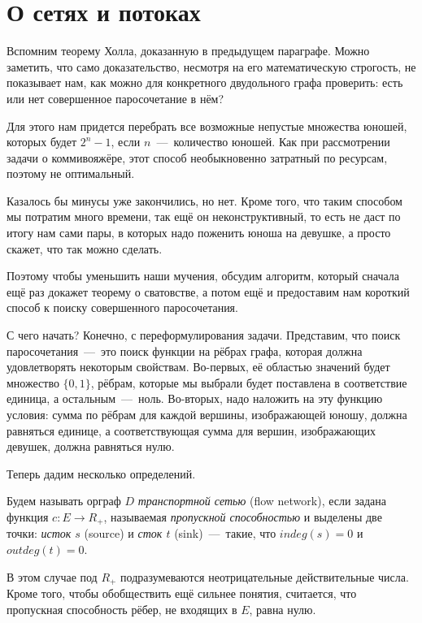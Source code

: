 \newpage
\section{О сетях и потоках}

	Вспомним теорему Холла, доказанную в предыдущем параграфе. Можно заметить, что само доказательство, несмотря на его математическую строгость, не показывает нам, как можно для конкретного двудольного графа проверить: есть или нет совершенное паросочетание в нём? 
	
	Для этого нам придется перебрать все возможные непустые множества юношей, которых будет $2^n - 1$, если $n$~---~количество юношей. Как при рассмотрении задачи о коммивояжёре, этот способ необыкновенно затратный по ресурсам, поэтому не оптимальный. 
	
	Казалось бы минусы уже закончились, но нет. Кроме того, что таким способом мы потратим много времени, так ещё он неконструктивный, то есть не даст по итогу нам сами пары, в которых надо поженить юноша на девушке, а просто скажет, что так можно сделать.
	
	Поэтому чтобы уменьшить наши мучения, обсудим алгоритм, который сначала ещё раз докажет теорему о сватовстве, а потом ещё и предоставим нам короткий способ к поиску совершенного паросочетания.

	С чего начать? Конечно, с переформулирования задачи. Представим, что поиск паросочетания~---~это поиск функции на рёбрах графа, которая должна удовлетворять некоторым свойствам. Во-первых, её областью значений будет множество $\lbrace 0, 1\rbrace$, рёбрам, которые мы выбрали будет поставлена в соответствие единица, а остальным~---~ноль. Во-вторых, надо наложить на эту функцию условия: сумма по рёбрам для каждой вершины, изображающей юношу, должна равняться единице, а соответствующая сумма для вершин, изображающих девушек, должна равняться нулю. 
	
	Теперь дадим несколько определений.
	
	
\begin{definition}
	Будем называть орграф $D$ \emph{транспортной сетью} (flow network), если задана функция $c\colon E \to R_{+}$, называемая \emph{пропускной способностью} и выделены две точки: \emph{исток $s$} (source) и \emph{сток $t$} (sink)~---~такие, что $indeg(s) = 0$ и $outdeg(t) = 0$.
\end{definition}

	В этом случае под $R_{+}$ подразумеваются неотрицательные действительные числа. Кроме того, чтобы обобществить ещё сильнее понятия, считается, что пропускная способность рёбер, не входящих в $E$, равна нулю.

